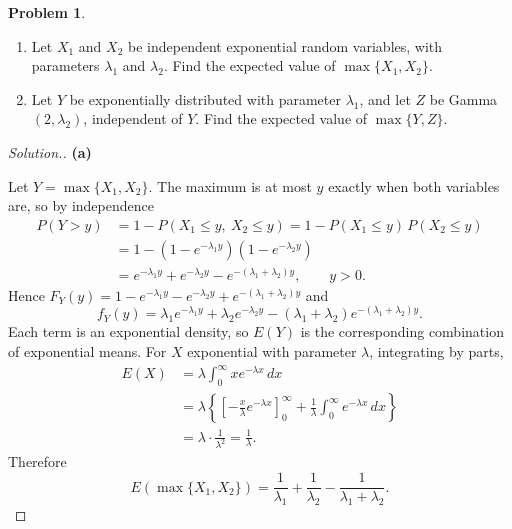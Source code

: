 \documentclass[11pt,a4paper]{article}
\theoremstyle{definition}
\newtheorem{problemx}{Problem}[subsection]
\newenvironment{problem}{\begin{problemx}}{\end{problemx}}
\newenvironment{solution}
  {\renewcommand{\qedsymbol}{}\begin{proof}[\textit{Solution}.]}
  {\end{proof}}
\newcommand{\subhead}[1]{%
  \par\medskip\noindent\textbf{#1}\par\nobreak\smallskip}
\begin{document}
\begin{problem}
\begin{enumerate}[label=(\alph*)]
\item Let $X_1$ and $X_2$ be independent exponential random variables, with
parameters $\lambda_1$ and $\lambda_2$. Find the expected value of
$\max\{X_1,X_2\}$.
\item Let $Y$ be exponentially distributed with parameter $\lambda_1$, and let
$Z$ be Gamma$(2,\lambda_2)$, independent of $Y$. Find the expected value of
$\max\{Y,Z\}$.
\end{enumerate}
\end{problem}
\begin{solution}
\subhead{(a)}
Let $Y = \max\{X_1,X_2\}$. The maximum is at most $y$ exactly when both
variables are, so by independence
\begin{align*}
P(Y>y) &= 1-P(X_1\leq y,\ X_2\leq y) = 1-P(X_1\leq y)\,P(X_2\leq y)\\
&= 1-\left(1-e^{-\lambda_1y}\right)\left(1-e^{-\lambda_2y}\right)\\
&= e^{-\lambda_1y}+e^{-\lambda_2y}-e^{-(\lambda_1+\lambda_2)y},\qquad y>0 .
\end{align*}
Hence $F_Y(y) = 1-e^{-\lambda_1y}-e^{-\lambda_2y}+e^{-(\lambda_1+\lambda_2)y}$
and
$$f_Y(y) = \lambda_1e^{-\lambda_1y}+\lambda_2e^{-\lambda_2y}
-(\lambda_1+\lambda_2)e^{-(\lambda_1+\lambda_2)y}.$$
Each term is an exponential density, so $E(Y)$ is the corresponding combination
of exponential means. For $X$ exponential with parameter $\lambda$, integrating
by parts,
\begin{align*}
E(X) &= \lambda\int_0^{\infty}xe^{-\lambda x}\,dx\\
&= \lambda\left\{\left[-\frac{x}{\lambda}e^{-\lambda x}\right]_0^{\infty}
+ \frac{1}{\lambda}\int_0^{\infty}e^{-\lambda x}\,dx\right\}\\
&= \lambda\cdot\frac{1}{\lambda^{2}} = \frac{1}{\lambda}.
\end{align*}
Therefore
$$E\left(\max\{X_1,X_2\}\right)
= \frac{1}{\lambda_1}+\frac{1}{\lambda_2}-\frac{1}{\lambda_1+\lambda_2}.$$


\end{solution}
\end{document}
